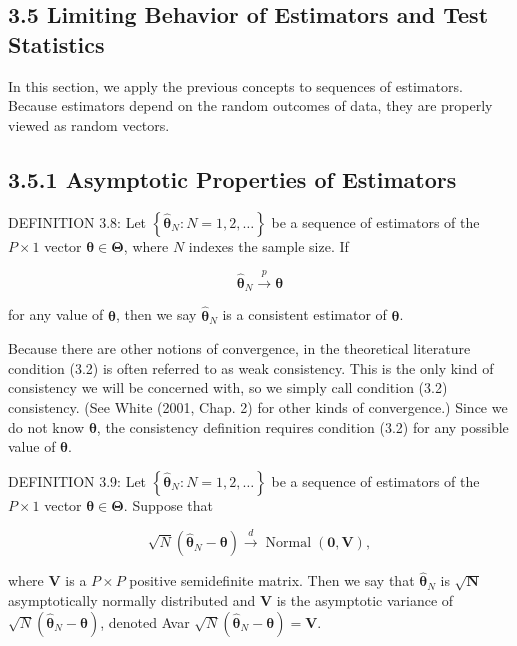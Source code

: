 \documentclass[10pt]{article}
\begin{document}
\subsection*{3.5 Limiting Behavior of Estimators and Test Statistics}
In this section, we apply the previous concepts to sequences of estimators. Because estimators depend on the random outcomes of data, they are properly viewed as random vectors.

\subsection*{3.5.1 Asymptotic Properties of Estimators}
DEFINITION 3.8: Let $\left\{\hat{\boldsymbol{\theta}}_{N}: N=1,2, \ldots\right\}$ be a sequence of estimators of the $P \times 1$ vector $\boldsymbol{\theta} \in \boldsymbol{\Theta}$, where $N$ indexes the sample size. If


\begin{equation*}
\hat{\boldsymbol{\theta}}_{N} \xrightarrow{p} \boldsymbol{\theta} \tag{3.2}
\end{equation*}


for any value of $\boldsymbol{\theta}$, then we say $\hat{\boldsymbol{\theta}}_{N}$ is a consistent estimator of $\boldsymbol{\theta}$.

Because there are other notions of convergence, in the theoretical literature condition (3.2) is often referred to as weak consistency. This is the only kind of consistency we will be concerned with, so we simply call condition (3.2) consistency. (See White (2001, Chap. 2) for other kinds of convergence.) Since we do not know $\boldsymbol{\theta}$, the consistency definition requires condition (3.2) for any possible value of $\boldsymbol{\theta}$.

DEFINITION 3.9: Let $\left\{\hat{\boldsymbol{\theta}}_{N}: N=1,2, \ldots\right\}$ be a sequence of estimators of the $P \times 1$ vector $\boldsymbol{\theta} \in \boldsymbol{\Theta}$. Suppose that


\begin{equation*}
\sqrt{N}\left(\hat{\boldsymbol{\theta}}_{N}-\boldsymbol{\theta}\right) \xrightarrow{d} \operatorname{Normal}(\mathbf{0}, \mathbf{V}), \tag{3.3}
\end{equation*}


where $\mathbf{V}$ is a $P \times P$ positive semidefinite matrix. Then we say that $\hat{\boldsymbol{\theta}}_{N}$ is $\sqrt{\mathbf{N}}$ asymptotically normally distributed and $\mathbf{V}$ is the asymptotic variance of $\sqrt{N}\left(\hat{\boldsymbol{\theta}}_{N}-\boldsymbol{\theta}\right)$, denoted Avar $\sqrt{N}\left(\hat{\boldsymbol{\theta}}_{N}-\boldsymbol{\theta}\right)=\mathbf{V}$.
\end{document}

